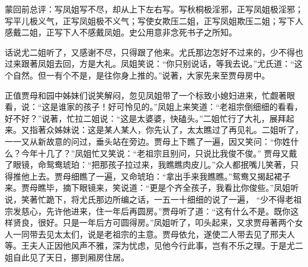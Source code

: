 \begin{parag}

    \begin{note}蒙回前总评：写凤姐写不尽，却从上下左右写。写秋桐极淫邪，正写凤姐极淫邪；写平儿极义气，正写凤姐极不义气；写使女欺压二姐，正写凤姐欺压二姐；写下人感戴二姐，正写下人不感戴凤姐。史公用意非念死书子之所知。\end{note}
\end{parag}

\begin{parag}

    话说尤二姐听了，又感谢不尽，只得跟了他来。尤氏那边怎好不过来的，少不得也过来跟著凤姐去回，方是大礼。凤姐笑说：“你只别说话，等我去说。”尤氏道：“这个自然。但一有个不是，是往你身上推的。”说著，大家先来至贾母房中。
\end{parag}


\begin{parag}


    正值贾母和园中姊妹们说笑解闷，忽见凤姐带了一个标致小媳妇进来，忙觑著眼看，说：“这是谁家的孩子！好可怜见的。”凤姐上来笑道：“老祖宗倒细细的看看，好不好？”说著，忙拉二姐说：“这是太婆婆，快磕头。”二姐忙行了大礼，展拜起来。又指著众姊妹说：这是某人某人，你先认了，太太瞧过了再见礼。二姐听了，一一又从新故意的问过，垂头站在旁边。贾母上下瞧了一遍，因又笑问：“你姓什么？今年十几了？”凤姐忙又笑说：“老祖宗且别问，只说比我俊不俊。” 贾母又戴了眼镜，命鸳鸯琥珀：“把那孩子拉过来，我瞧瞧肉皮儿。”众人都抿嘴儿笑著，只得推他上去。贾母细瞧了一遍，又命琥珀：“拿出手来我瞧瞧。”鸳鸯又揭起裙子来。贾母瞧毕，摘下眼镜来，笑说道：“更是个齐全孩子，我看比你俊些。”凤姐听说，笑著忙跪下，将尤氏那边所编之话，一五一十细细的说了一遍， “少不得老祖宗发慈心，先许他进来，住一年后再圆房。”贾母听了道：“这有什么不是。既你这样贤良，很好。只是一年后方可圆得房。”凤姐听了，叩头起来，又求贾母著两个女人一同带去见太太们，说是老祖宗的主意。贾母依允，遂使二人带去见了邢夫人等。王夫人正因他风声不雅，深为忧虑，见他今行此事，岂有不乐之理。于是尤二姐自此见了天日，挪到厢房住居。
\end{parag}


